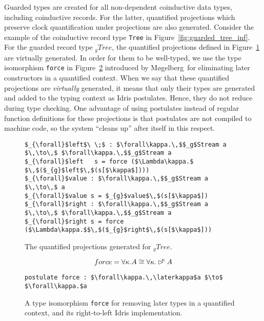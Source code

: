Guarded types are created for all non-dependent coinductive data types,
including coinductive records. For the latter, quantified
projections which preserve clock quantification under
projections are also generated. Consider the example of the coinductive record type \texttt{Tree}
in Figure~\ref{fig:guarded_tree_inf}. For the guarded record type $_{g}Tree$, the
quantified projections defined in Figure~\ref{fig:tree_quantified_projections}
are virtually generated. In order for them to be well-typed, we use the type
isomorphism \texttt{force} in Figure~\ref{fig:quantified_later_iso} introduced by
Møgelberg\,\citep{Mogelberg:2014} for eliminating later constructors in a
quantified context. When we say that these quantified projections are
\emph{virtually} generated, it means that only their types are generated and
added to the typing context as Idris postulates. Hence, they do not reduce
during type checking. One advantage of using postulates instead of regular
function definitions for these projections is that postulates are not compiled
to machine code, so the system ``cleans up'' after itself in this respect.

\begin{figure}[h]
\begin{lstlisting}[mathescape,title=\idrisBlock]
$_{\forall}$left$\ \;$ : $\forall\kappa.\,$$_g$Stream a $\,\to\,$ $\forall\kappa.\,$$_g$Stream a
$_{\forall}$left   s = force ($\Lambda\kappa.$ $\,$($_{g}$left$\,$(s[$\kappa$])))
$_{\forall}$value : $\forall\kappa.\,$$_g$Stream a $\,\to\,$ a
$_{\forall}$value s = $_{g}$value$\,$(s[$\kappa$])
$_{\forall}$right : $\forall\kappa.\,$$_g$Stream a $\,\to\,$ $\forall\kappa.\,$$_g$Stream a
$_{\forall}$right s = force ($\Lambda\kappa.$$\,$($_{g}$right$\,$(s[$\kappa$]))
\end{lstlisting}
  \caption{The quantified projections generated for $_{g}Tree$.}
\label{fig:tree_quantified_projections}
\end{figure}

\begin{figure}[h]
\[
force = \forall \kappa .A\cong \forall\kappa.\rhd^{\!\!\kappa} A
\]
\begin{lstlisting}[mathescape,title=\idrisBlock]
postulate force : $\forall\kappa.\,\laterkappa$a $\to$ $\forall\kappa.$a
\end{lstlisting}
  \caption{A type isomorphism \texttt{force} for removing later types in a quantified context, and
    its right-to-left Idris implementation.}
\label{fig:quantified_later_iso}
\end{figure}

